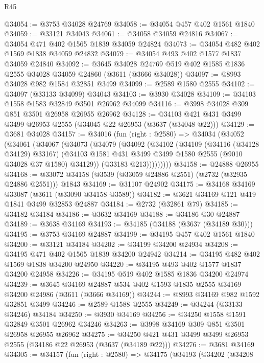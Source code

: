 \begin{lexlean}{R45}
\begin{coremodule}
@34054 := @3753 @34028 @24769
@34058 := @34054 @457 @402 @1561 @1840
@34059 := @33121 @34043
@34061 := @34058 @34059 @24816
@34067 := @34054 @471 @402 @1565 @1839 @34059 @24824
@34073 := @34054 @482 @402 @1569 @1838 @34059 @24832
@34079 := @34054 @493 @402 @1577 @1837 @34059 @24840
@34092 := @3645
    @34028
    @24769
    @519
    @402
    @1585
    @1836
    @2555
    @34028
    @34059
    @24860
    (@3611 (@3666 @34028))
@34097 := @8993 @34028 @982 @1584 @32851 @3499
@34099 := @2589 @1580 @2555
@34102 := @34097 (@33133 @34099) @34043
@34103 := @3930 @34028
@34109 := @34103 @1558 @1583 @32849 @3501 @26962 @34099
@34116 := @3998 @34028 @309 @851 @3501 @26958 @26955 @26962
@34128 := @34103 @421 @431 @3499 @3499 @26953 @2555 (@34045 @22 @26953 (@3637 (@34048 @22)))
@34129 := @3681 @34028
@34157 := @34016
    (fun (right : @2580) =>
    @34034
      (@34052
        (@34061
          (@34067
            (@34073
              (@34079
                (@34092
                  (@34102
                    (@34109
                      (@34116 (@34128 @34129) @33167)
                      (@34103 @1581 @431 @3499 @3499 @1580 @2555 (@9010 @34028 @37 @1580) @34129))
                    (@33183 @213)))))))))
@34158 := @24888 @26955
@34168 := @33072 @34158 (@3539 (@33059 @24886 @2551) (@2732 (@32935 @24886 @2551))) @1843
@34169 := @31107 @24902
@34175 := @34168 @34169 @33087 (@3611 (@33090 @34158 @3589))
@34182 := @3621 @34169 @121 @419 @1841 @3499 @32853 @24887
@34184 := @2732 (@32861 @79)
@34185 := @34182 @34184
@34186 := @3632 @34169
@34188 := @34186 @30 @24887
@34189 := @3638 @34169
@34193 := @34185 (@34188 (@3637 (@34189 @30)))
@34195 := @3753 @34169 @24887
@34199 := @34195 @457 @402 @1561 @1840
@34200 := @33121 @34184
@34202 := @34199 @34200 @24934
@34208 := @34195 @471 @402 @1565 @1839 @34200 @24942
@34214 := @34195 @482 @402 @1569 @1838 @34200 @24950
@34220 := @34195 @493 @402 @1577 @1837 @34200 @24958
@34226 := @34195 @519 @402 @1585 @1836 @34200 @24974
@34239 := @3645
    @34169
    @24887
    @534
    @402
    @1593
    @1835
    @2555
    @34169
    @34200
    @24986
    (@3611 (@3666 @34169))
@34244 := @8993 @34169 @982 @1592 @32851 @3499
@34246 := @2589 @1588 @2555
@34249 := @34244 (@33133 @34246) @34184
@34250 := @3930 @34169
@34256 := @34250 @1558 @1591 @32849 @3501 @26962 @34246
@34263 := @3998 @34169 @309 @851 @3501 @26958 @26955 @26962
@34275 := @34250 @421 @431 @3499 @3499 @26953 @2555 (@34186 @22 @26953 (@3637 (@34189 @22)))
@34276 := @3681 @34169
@34305 := @34157
    (fun (right : @2580) =>
    @34175
      (@34193
        (@34202
          (@34208

\end{coremodule}
\end{lexlean}

